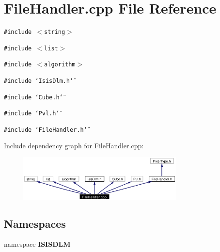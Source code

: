 \section{File\-Handler.cpp File Reference}
\label{FileHandler_8cpp}
{\tt \#include $<$string$>$}\par
{\tt \#include $<$list$>$}\par
{\tt \#include $<$algorithm$>$}\par
{\tt \#include \char`\"{}Isis\-Dlm.h\char`\"{}}\par
{\tt \#include \char`\"{}Cube.h\char`\"{}}\par
{\tt \#include \char`\"{}Pvl.h\char`\"{}}\par
{\tt \#include \char`\"{}File\-Handler.h\char`\"{}}\par


Include dependency graph for File\-Handler.cpp:\begin{figure}[H]
\begin{center}
\leavevmode
\includegraphics[width=236pt]{FileHandler_8cpp__incl}
\end{center}
\end{figure}
\subsection*{Namespaces}
\begin{CompactItemize}
\item 
namespace {\bf ISISDLM}
\end{CompactItemize}
